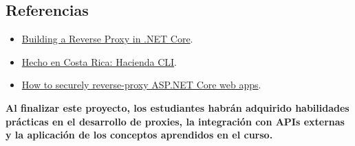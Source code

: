 \documentclass[
]{agujournal2019}
\begin{document}
\subsection{Referencias}\label{referencias-3}

\begin{itemize}
\item
  \href{https://auth0.com/blog/building-a-reverse-proxy-in-dot-net-core/}{Building
  a Reverse Proxy in .NET Core}.
\item
  \href{https://medium.com/@kevinah95/hecho-en-costa-rica-hacienda-cli-d922490d6aca}{Hecho
  en Costa Rica: Hacienda CLI}.
\item
  \href{https://dev.to/asimmon/how-to-securely-reverse-proxy-aspnet-core-web-apps-3h4c}{How
  to securely reverse-proxy ASP.NET Core web apps}.
\end{itemize}

\textbf{Al finalizar este proyecto, los estudiantes habrán adquirido
habilidades prácticas en el desarrollo de proxies, la integración con
APIs externas y la aplicación de los conceptos aprendidos en el curso.}
\end{document}
